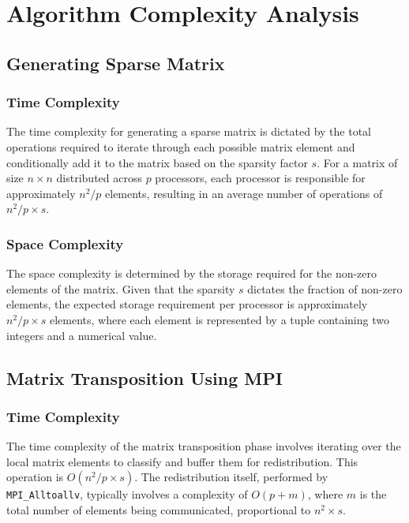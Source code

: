 \documentclass{article}
\begin{document}
\section{Algorithm Complexity Analysis}

\subsection{Generating Sparse Matrix}

\subsubsection{Time Complexity}
The time complexity for generating a sparse matrix is dictated by the total operations required to iterate through each possible matrix element and conditionally add it to the matrix based on the sparsity factor \( s \). For a matrix of size \( n \times n \) distributed across \( p \) processors, each processor is responsible for approximately \( n^2 / p \) elements, resulting in an average number of operations of \( n^2 / p \times s \).

\subsubsection{Space Complexity}
The space complexity is determined by the storage required for the non-zero elements of the matrix. Given that the sparsity \( s \) dictates the fraction of non-zero elements, the expected storage requirement per processor is approximately \( n^2 / p \times s \) elements, where each element is represented by a tuple containing two integers and a numerical value.

\subsection{Matrix Transposition Using MPI}

\subsubsection{Time Complexity}
The time complexity of the matrix transposition phase involves iterating over the local matrix elements to classify and buffer them for redistribution. This operation is \( O(n^2 / p \times s) \). The redistribution itself, performed by \texttt{MPI\_Alltoallv}, typically involves a complexity of \( O(p + m) \), where \( m \) is the total number of elements being communicated, proportional to \( n^2 \times s \).
\end{document}
